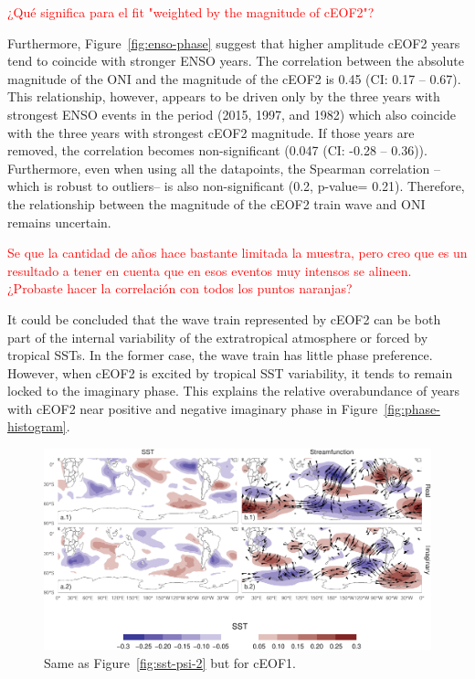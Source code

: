 \documentclass[smallextended]{svjour3}       %
\begin{document}
\textcolor{red}{¿Qué significa para el fit "weighted by the magnitude of cEOF2"?}

Furthermore, Figure~\ref{fig:enso-phase} suggest that higher amplitude cEOF2 years tend to coincide with stronger ENSO years.
The correlation between the absolute magnitude of the ONI and the magnitude of the cEOF2 is 0.45 (CI: 0.17 -- 0.67).
This relationship, however, appears to be driven only by the three years with strongest ENSO events in the period (2015, 1997, and 1982) which also coincide with the three years with strongest cEOF2 magnitude.
If those years are removed, the correlation becomes non-significant (0.047 (CI: -0.28 -- 0.36)).
Furthermore, even when using all the datapoints, the Spearman correlation --which is robust to outliers-- is also non-significant (0.2, p-value= 0.21).
Therefore, the relationship between the magnitude of the cEOF2 train wave and ONI remains uncertain.

\textcolor{red}{Se que la cantidad de años hace bastante limitada la muestra, pero creo que es un resultado a tener en cuenta que en esos eventos muy intensos se alineen. ¿Probaste hacer la correlación con todos los puntos naranjas?}

It could be concluded that the wave train represented by cEOF2 can be both part of the internal variability of the extratropical atmosphere or forced by tropical SSTs.
In the former case, the wave train has little phase preference.
However, when cEOF2 is excited by tropical SST variability, it tends to remain locked to the imaginary phase.
This explains the relative overabundance of years with cEOF2 near positive and negative imaginary phase in Figure~\ref{fig:phase-histogram}.



\begin{figure}
\includegraphics{../figures/sst-psi-1-1} \caption{Same as Figure~\ref{fig:sst-psi-2} but for cEOF1.}\label{fig:sst-psi-1}
\end{figure}
\end{document}
